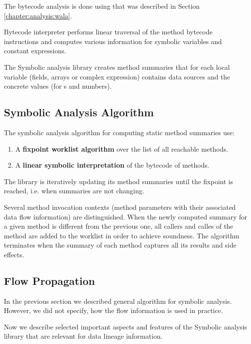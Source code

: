The bytecode analysis is done using \citet{WalaFramework}
that was described in Section \ref{chapter:analysis:wala}.

Bytecode interpreter performs linear traversal of the method bytecode instructions
and computes various information for symbolic variables and constant expressions.

The Symbolic analysis library creates method summaries that for each
local variable (fields, arrays or complex expression) contains
data sources and the concrete values (for s and numbers).



\subsection{Symbolic Analysis Algorithm}

The symbolic analysis algorithm for computing static method summaries use:
\begin{enumerate}
  \item A \textbf{fixpoint worklist algorithm} over the list of all reachable methods.
  \item A \textbf{linear symbolic interpretation} of the bytecode of methods.
\end{enumerate}

The library is iteratively updating its method summaries until the fixpoint is reached, i.e.
when summaries are not changing.

Several method invocation contexts (method parameters with their associated data flow information)
are distinguished. When the newly computed summary for a given method is different from the previous
one, all callers and calles of the method are added to the worklist in order to achieve soundness.
The algorithm terminates when the summary of each method captures all its results and side effects.




\subsection{Flow Propagation}

In the previous section we described general algorithm for symbolic analysis.
However, we did not specify, how the flow information is used in practice.

Now we describe selected important aspects and features of the Symbolic analysis library
that are relevant for data lineage information.




